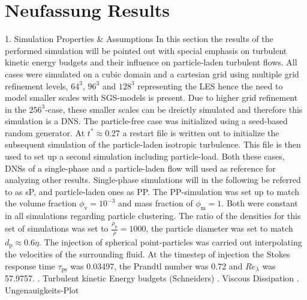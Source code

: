 \documentclass[11pt,a4paper,openany,oneside,parskip=half*]{article}
\begin{document}
\section{Neufassung Results}
1. Simulation Properties \& Assumptions
\newline
In this section the results of the performed simulation will be pointed out with special emphasis on turbulent kinetic energy budgets and their influence on particle-laden turbulent flows.
\newline
All cases were simulated on a cubic domain and a cartesian grid using multiple grid refinement levels, $64^3$, $96^3$ and $128^3$ representing the LES hence the need to model smaller scales with SGS-models is present. Due to higher grid refinement in the $256^3$-case, these smaller scales can be dreictly simulated and therefore this simulation is a DNS.
\newline
The particle-free case was initialized using a seed-based random generator. At $t^* \approx 0.27$ a restart file is written out to initialize the subsequent simulation of the particle-laden isotropic turbulence. This file is then used to set up a second simulation including particle-load. Both these cases, DNSs of a single-phase and a particle-laden flow will used as reference for analyzing other results. Single-phase simulations will in the following be referred to as sP, and particle-laden ones as PP. The PP-simulation was set up to match the volume fraction $\phi_\mathrm{v}= 10^{-3}$ and mass fraction of $\phi_\mathrm{m}=1$. Both were constant in all simulations regarding particle clustering. The ratio of the densities for this set of simulations was set to $\frac{\rho_\mathrm{p}}{\rho} = 1000$, the particle diameter was set to match $d_\mathrm{p} \approx 0.6 \eta$. The injection of spherical point-particles was carried out interpolating the velocities of the surrounding fluid. At the timestep of injection the Stokes response time $\tau_\mathrm{ps}$ was 0.03497, the Prandtl number was 0.72 and $Re_\lambda$ was 57.9757. 
. Turbulent kinetic Energy budgets (Schneiders)
\newline
{}. Viscous Dissipation
\newline
{}. Ungenauigkeits-Plot
\newline
\end{document}
